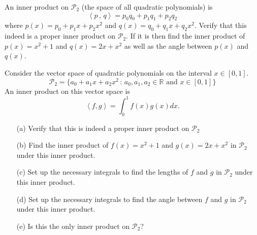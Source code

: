 \begin{problem}
    An inner product on $\mathcal{P}_2$ (the space of all quadratic polynomials) is 
    \[ \left< p \,,\, q \right> = p_0 q_0 + p_1 q_1 + p_2 q_2 \]
    where $p(x) = p_0 + p_1x + p_2 x^2$ and $q(x) = q_0 + q_1 x + q_2 x^2$.  Verify that
    this indeed is a proper inner product on $\mathcal{P}_2$.  If it is then find the
    inner product of $p(x) = x^2 + 1$ and $q(x) = 2x+x^2$ as well as the angle between
    $p(x)$ and $q(x)$.
\end{problem}


\begin{problem}
    Consider the vector space of quadratic polynomials on the interval $x \in [0,1]$.
    \[ \mathcal{P}_2 = \{a_0 + a_1 x + a_2 x^2 \, : \, a_0, a_1, a_2 \in
        \mathbb{R} \text{ and } x \in [0,1] \} \]
    An inner product on this vector space is
    \[ \left< f,g\right> =
    \int_0^1 f(x) g(x) dx. \] 
    \begin{enumerate}
        \item[(a)] Verify that this is indeed a proper inner product on $\mathcal{P}_2$
        \item[(b)] Find the inner product of $f(x) = x^2+1$ and $g(x) =
            2x+x^2$ in $\mathcal{P}_2$ under this inner product.
        \item[(c)] Set up the necessary integrals to find the lengths of $f$ and $g$ in
            $\mathcal{P}_2$ under this inner product.
        \item[(d)] Set up the necessary integrals to find the angle between $f$ and $g$ in
            $\mathcal{P}_2$ under this inner product.
        \item[(e)] Is this the only inner product on $\mathcal{P}_2$?
    \end{enumerate}

\end{problem}


